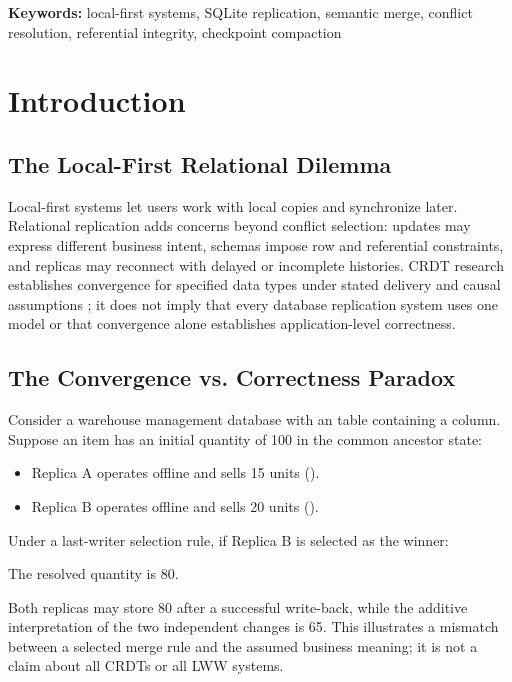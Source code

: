 \documentclass[runningheads]{llncs}
\begin{document}
\textbf{Keywords:} local-first systems, SQLite replication, semantic merge, conflict resolution, referential integrity, checkpoint compaction

\section{Introduction}
\subsection{The Local-First Relational Dilemma}
Local-first systems let users work with local copies and synchronize later. Relational replication adds concerns beyond conflict selection: updates may express different business intent, schemas impose row and referential constraints, and replicas may reconnect with delayed or incomplete histories. CRDT research establishes convergence for specified data types under stated delivery and causal assumptions \cite{shapiro2011,gomes2017}; it does not imply that every database replication system uses one model or that convergence alone establishes application-level correctness.

\subsection{The Convergence vs. Correctness Paradox}
Consider a warehouse management database with an \texttt{} table containing a \texttt{} column. Suppose an item has an initial quantity of 100 in the common ancestor state:

\begin{itemize}
\item Replica A operates offline and sells 15 units (\texttt{}).
\item Replica B operates offline and sells 20 units (\texttt{}).
\end{itemize}
Under a last-writer selection rule, if Replica B is selected as the winner:

The resolved quantity is 80.

Both replicas may store 80 after a successful write-back, while the additive interpretation of the two independent changes is 65. This illustrates a mismatch between a selected merge rule and the assumed business meaning; it is not a claim about all CRDTs or all LWW systems.
\end{document}
